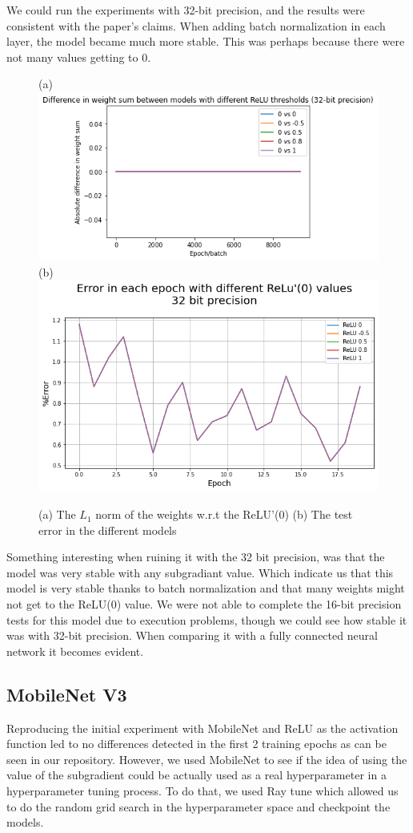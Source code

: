 We could run the experiments with 32-bit precision, and the results were consistent with the paper's claims. When adding batch normalization in each layer, the model became much more stable. This was perhaps because there were not many values getting to 0. 

\begin{figure}[hbtp]
    \centering
        \subfigure(a){\includegraphics[width=0.45\columnwidth]{Images/RN_weight_32.png}} 
        \subfigure(b){\includegraphics[width=0.4\columnwidth]{Images/ResN18_Test.png}}
    \caption{(a) The $L_1$ norm of the weights w.r.t the ReLU'(0) (b) The test error in the different models }
\end{figure}

Something interesting when ruining it with the 32 bit precision, was that the model was very stable with any subgradiant value. Which indicate us that this model is very stable thanks to batch normalization and that many weights might not get to the ReLU(0) value. We were not able to complete the 16-bit precision tests for this model due to execution problems, though we could see how stable it was with 32-bit precision. When comparing it with a fully connected neural network it becomes evident.

\subsection{MobileNet V3}

Reproducing the initial experiment with MobileNet and ReLU as the activation function led to no differences detected in the first 2 training epochs as can be seen in our repository. However, we used MobileNet to see if the idea of using the value of the subgradient could be actually used as a real hyperparameter in a hyperparameter tuning process.
To do that, we used Ray tune which allowed us to do the random grid search in the hyperparameter space and checkpoint the models.

